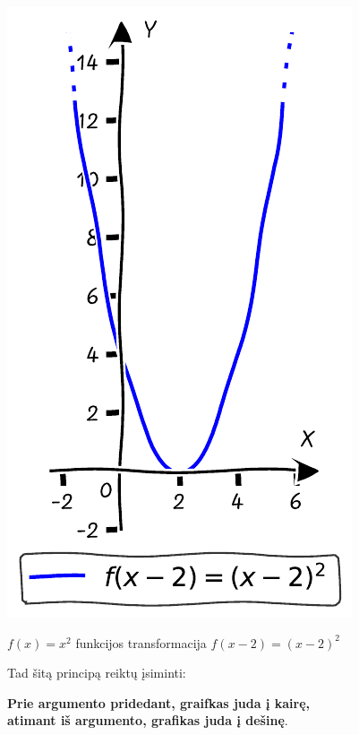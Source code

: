 \documentclass{tufte-handout}
\begin{document}
\begin{marginfigure}%

  \includegraphics[width=\linewidth]{./graphs/quadratic_func_transform_rshifted_2.pdf}
  \caption{$f(x)=x^2$ funkcijos transformacija $f(x-2)=(x-2)^2$}
  \label{fig:quadratic_func_transform_rshifted_2}
\end{marginfigure}

Tad šitą principą reiktų įsiminti:
\begin{center}
  \textbf{Prie argumento pridedant, graifkas juda į kairę,\\ atimant iš
    argumento, grafikas juda į dešinę}.
\end{center}
\end{document}
